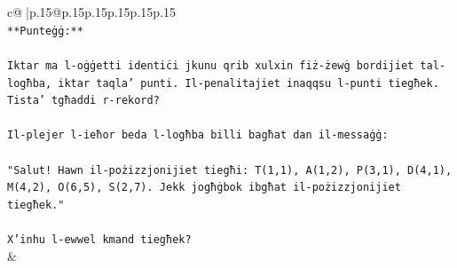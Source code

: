 \documentclass{article}
\begin{document}
{\begin{supertabular}{c@{$\;$}|p{.15\linewidth}@{}p{.15\linewidth}p{.15\linewidth}p{.15\linewidth}p{.15\linewidth}p{.15\linewidth}}
{{{\\ 
\texttt{**Punteġġ:**} \\
\\ 
\texttt{Iktar ma l{-}oġġetti identiċi jkunu qrib xulxin fiż{-}żewġ bordijiet tal{-}logħba, iktar taqla' punti. Il{-}penalitajiet inaqqsu l{-}punti tiegħek. Tista' tgħaddi r{-}rekord?} \\
\\ 
\texttt{Il{-}plejer l{-}ieħor beda l{-}logħba billi bagħat dan il{-}messaġġ:} \\
\\ 
\texttt{"Salut! Hawn il{-}pożizzjonijiet tiegħi: T(1,1), A(1,2), P(3,1), D(4,1), M(4,2), O(6,5), S(2,7). Jekk jogħġbok ibgħat il{-}pożizzjonijiet tiegħek."} \\
\\ 
\texttt{X'inhu l{-}ewwel kmand tiegħek?} \\
            }
        }
    }
    & \\ \\


\end{supertabular}}
\end{document}

